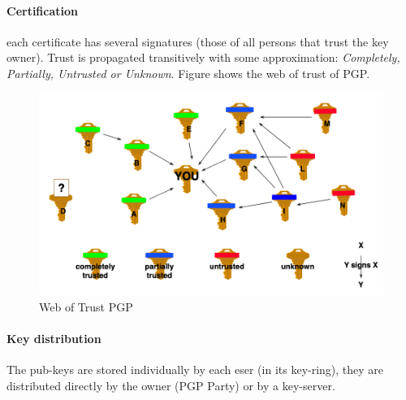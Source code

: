 \documentclass[12pt]{article}
\begin{document}
\paragraph{Certification} each certificate has several signatures (those of all persons that trust the key owner). Trust is propagated transitively with some approximation: \textit{Completely, Partially, Untrusted or Unknown}. Figure shows the web of trust of PGP.
\begin{figure}[H]
   \centering
   \includegraphics[width=\linewidth]{images/wt_pgp.png}
   \caption{Web of Trust PGP}
   \label{fig:wt_pgp}
\end{figure}
\paragraph{Key distribution} The pub-keys are stored individually by each eser (in its key-ring), they are distributed directly by the owner (PGP Party) or by a key-server.
\end{document}
